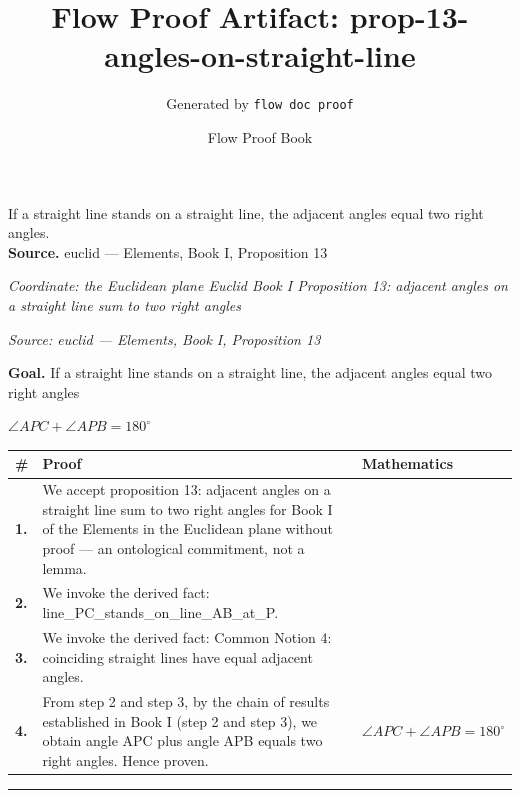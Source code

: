 \documentclass[11pt]{article}
\title{Flow Proof Artifact: prop-13-angles-on-straight-line}
\author{Generated by \texttt{flow doc proof}}
\date{Flow Proof Book}
\theoremstyle{definition}
\begin{document}
\maketitle
If a straight line stands on a straight line, the adjacent angles equal two right angles.\\[0.5em]
\textbf{Source.} euclid — Elements, Book I, Proposition 13\\[0.5em]
\bigskip
{}\par
\smallskip\noindent\textit{Coordinate: the Euclidean plane \cdot Euclid Book I \cdot Proposition 13: adjacent angles on a straight line sum to two right angles}\par
\smallskip\noindent\textit{Source: euclid — Elements, Book I, Proposition 13}\par
\medskip
\noindent\textbf{Goal.} If a straight line stands on a straight line, the adjacent angles equal two right angles\par
\noindent$\displaystyle \angle APC + \angle APB = 180^\circ$\par
\medskip
\noindent
\begin{tabular}{@{} >{\raggedright\arraybackslash}p{} >{\raggedright\arraybackslash}p{} >{\raggedleft\arraybackslash}p{} @{}}
\textbf{\#} & \textbf{Proof} & \textbf{Mathematics} \\
\midrule
\textbf{1.} & We accept proposition 13: adjacent angles on a straight line sum to two right angles for Book I of the Elements in the Euclidean plane without proof — an ontological commitment, not a lemma. & \\[0.45em]
\textbf{2.} & We invoke the derived fact: line\_PC\_stands\_on\_line\_AB\_at\_P. & \\[0.45em]
\textbf{3.} & We invoke the derived fact: Common Notion 4: coinciding straight lines have equal adjacent angles. & \\[0.45em]
\textbf{4.} & From step 2 and step 3, by the chain of results established in Book I (step 2 and step 3), we obtain angle APC plus angle APB equals two right angles. Hence proven. & $\displaystyle \angle APC + \angle APB = 180^\circ$ \\[0.45em]
\bottomrule
\end{tabular}
\label{thm:Geometry-Euclid Book I-proposition_13_adjacent_angles_on_a_straight_line_sum_to_two_right_angles}
\par\medskip\hrule
\end{document}
